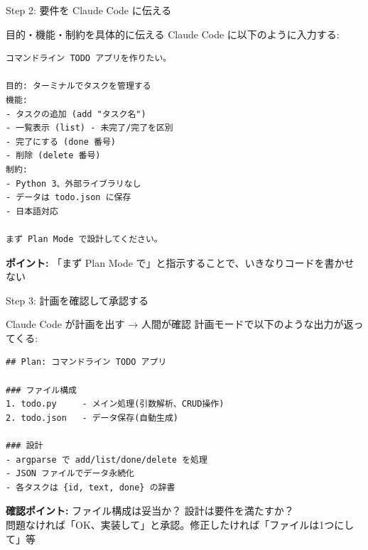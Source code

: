\documentclass[aspectratio=169, 14pt]{beamer}
\begin{document}
\begin{frame}[fragile]{Step 2: 要件を Claude Code に伝える}
  \begin{block}{目的・機能・制約を具体的に伝える}
    {\small Claude Code に以下のように入力する:}
  \end{block}

  \begin{lstlisting}[language={}, numbers=none]
コマンドライン TODO アプリを作りたい。

目的: ターミナルでタスクを管理する
機能:
- タスクの追加 (add "タスク名")
- 一覧表示 (list) - 未完了/完了を区別
- 完了にする (done 番号)
- 削除 (delete 番号)
制約:
- Python 3、外部ライブラリなし
- データは todo.json に保存
- 日本語対応

まず Plan Mode で設計してください。
  \end{lstlisting}

  {\scriptsize \textbf{ポイント:} 「まず Plan Mode で」と指示することで、いきなりコードを書かせない}
\end{frame}

\begin{frame}[fragile]{Step 3: 計画を確認して承認する}
  \begin{block}{Claude Code が計画を出す → 人間が確認}
    {\small 計画モードで以下のような出力が返ってくる:}
  \end{block}

  \begin{lstlisting}[language={}, numbers=none]
## Plan: コマンドライン TODO アプリ

### ファイル構成
1. todo.py     - メイン処理(引数解析、CRUD操作)
2. todo.json   - データ保存(自動生成)

### 設計
- argparse で add/list/done/delete を処理
- JSON ファイルでデータ永続化
- 各タスクは {id, text, done} の辞書
  \end{lstlisting}

  \vspace{0.2em}

  {\small
  \textbf{確認ポイント:} ファイル構成は妥当か？ 設計は要件を満たすか？ \\
  問題なければ「OK、実装して」と承認。修正したければ「ファイルは1つにして」等}
\end{frame}
\end{document}
